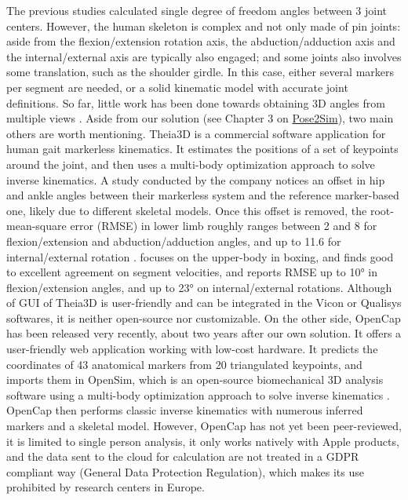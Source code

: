 The previous studies calculated single degree of freedom angles between 3 joint centers. However, the human skeleton is complex and not only made of pin joints: aside from the flexion/extension rotation axis, the abduction/adduction axis and the internal/external axis are typically also engaged; and some joints also involves some translation, such as the shoulder girdle. In this case, either several markers per segment are needed, or a solid kinematic model with accurate joint definitions. So far, little work has been done towards obtaining 3D angles from multiple views \cite{Zheng2022}. Aside from our solution (see Chapter 3 on \hyperref[ch:3]{Pose2Sim}), two main others are worth mentioning. Theia3D is a commercial software application for human gait markerless kinematics. It estimates the positions of a set of keypoints around the joint, and then uses a multi-body optimization approach to solve inverse kinematics. A study conducted by the company notices an offset in hip and ankle angles between their markerless system and the reference marker-based one, likely due to different skeletal models. Once this offset is removed, the root-mean-square error (RMSE) in lower limb roughly ranges between 2 and 8\degree{} for flexion/extension and abduction/adduction angles, and up to 11.6\degree{} for internal/external rotation \cite{Kanko2021b}. \cite{Lahkar2022b} focuses on the upper-body in boxing, and finds good to excellent agreement on segment velocities, and reports RMSE up to 10° in  flexion/extension angles, and up to 23° on internal/external rotations. Although of GUI of Theia3D is user-friendly and can be integrated in the Vicon or Qualisys softwares, it is neither open-source nor customizable. On the other side, OpenCap \cite{Uhlrich2022} has been released very recently, about two years after our own solution. It offers a user-friendly web application working with low-cost hardware. It predicts the coordinates of 43 anatomical markers from 20 triangulated keypoints, and imports them in OpenSim, which is an open-source biomechanical 3D analysis software using a multi-body optimization approach to solve inverse kinematics \cite{Delp2007,Seth2018}. OpenCap then performs classic inverse kinematics with numerous inferred markers and a skeletal model. However, OpenCap has not yet been peer-reviewed, it is limited to single person analysis, it only works natively with Apple products, and the data sent to the cloud for calculation are not treated in a GDPR compliant way (General Data Protection Regulation), which makes its use prohibited by research centers in Europe.

